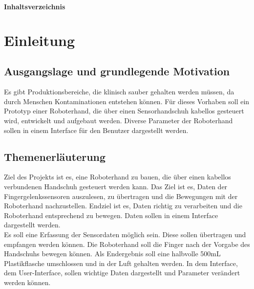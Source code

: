 \documentclass[titlepage,12pt,twoside]{article}
\begin{document}
\thispagestyle{empty}

\newpage
\thispagestyle{empty}
\begin{center}
    \vspace*{\fill}
    \Huge{\textbf{Inhaltsverzeichnis}}
    \vspace*{\fill}
\end{center}

\newpage


\tableofcontents


\newpage


\section{Einleitung}
\subsection{Ausgangslage und grundlegende Motivation}
Es gibt Produktionsbereiche, die klinisch sauber gehalten werden müssen, da durch Menschen Kontaminationen entstehen
können. Für dieses Vorhaben soll ein Prototyp einer Roboterhand, die über einen Sensorhandschuh kabellos gesteuert wird,
entwickelt und aufgebaut werden. Diverse Parameter der Roboterhand sollen in einem Interface für den Benutzer 
dargestellt werden. \\

\subsection{Themenerläuterung}
Ziel des Projekts ist es, eine Roboterhand zu bauen, die über einen kabellos verbundenen
Handschuh gesteuert werden kann. Das Ziel ist es, Daten der Fingergelenkssensoren auszulesen,
zu übertragen und die Bewegungen mit der Roboterhand nachzustellen. Endziel ist es, Daten
richtig zu verarbeiten und die Roboterhand entsprechend zu bewegen. Daten sollen in einem
Interface dargestellt werden. \\

Es soll eine Erfassung der Sensordaten möglich sein. Diese sollen übertragen und empfangen
werden können. Die Roboterhand soll die Finger nach der Vorgabe des Handschuhs bewegen
können. Als Endergebnis soll eine halbvolle 500mL Plastikflasche umschlossen und in der Luft
gehalten werden. In dem Interface, dem User-Interface, sollen wichtige Daten dargestellt und
Parameter verändert werden können. \\
\end{document}
